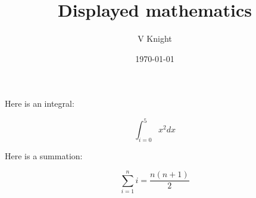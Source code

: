 \documentclass{article}
\title{Displayed mathematics}
\author{V Knight}
\date{\today}
\begin{document}
\maketitle

Here is an integral:

\[
    \int_{i=0}^{5}x ^ 2dx
\]

Here is a summation:

$$
    \sum_{i=1}^{n}i=\frac{n(n+1)}{2}
$$
\end{document}

